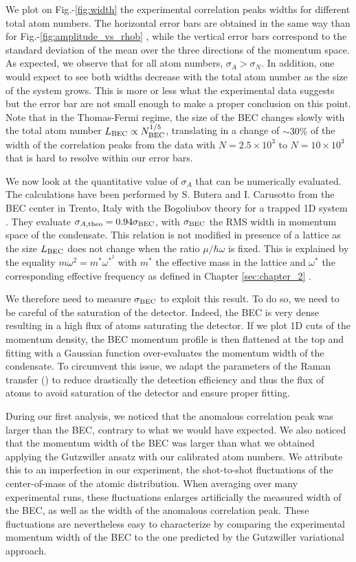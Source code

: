 We plot on Fig.-\ref{fig:width} the experimental correlation peaks widths for different total atom numbers. The horizontal error bars are obtained in the same way than for Fig.-\ref{fig:amplitude_vs_rhob} , while the vertical error bars correspond to the standard deviation of the mean over the three directions of the momentum space. As expected, we observe that for all atom numbers, $\sigma_A > \sigma_N$. In addition, one would expect to see both widths decrease with the total atom number as the size of the system grows. This is more or less what the experimental data suggests but the error bar are not small enough to make a proper conclusion on this point. Note that in the Thomas-Fermi regime, the size of the BEC changes slowly with the total atom number $L_{\rm{BEC}} \propto N_{\rm{BEC}}^{1/5}$, translating in a change of $\sim 30\%$ of the width of the correlation peaks from the data with $N=2.5 \times 10^3$ to $N=10 \times 10^3$ that is hard to resolve within our error bars.

We now look at the quantitative value of $\sigma_A$ that can be numerically evaluated. The calculations have been performed by S. Butera and I. Carusotto from the BEC center in Trento, Italy with the Bogoliubov theory for a trapped 1D system \cite{butera2020}. They evaluate $\sigma_{A,\rm{theo}} = 0.94 \sigma_{\rm{BEC}}$, with $\sigma_{\rm{BEC}}$ the RMS width in momentum space of the condensate. This relation is not modified in presence of a lattice as the size $L_{\rm{BEC}}$ does not change when the ratio $\mu/\hbar \omega$ is fixed. This is explained by the equality $m \omega^2 = m^* \omega^* ^2$ with $m^*$ the effective mass in the lattice and $\omega^*$ the corresponding effective frequency as defined in Chapter \ref{sec:chapter_2} .

We therefore need to measure $\sigma_{\rm{BEC}}$ to exploit this result. To do so, we need to be careful of the saturation of the detector. Indeed, the BEC is very dense resulting in a high flux of atoms saturating the detector. If we plot 1D cuts of the momentum density, the BEC momentum profile is then flattened at the top and fitting with a Gaussian function over-evaluates the momentum width of the condensate. To circumvent this issue, we adapt the parameters of the Raman transfer () to reduce drastically the detection efficiency and thus the flux of atoms to avoid saturation of the detector and ensure proper fitting.

During our first analysis, we noticed that the anomalous correlation peak was larger than the BEC, contrary to what we would have expected. We also noticed that the momentum width of the BEC was larger than what we obtained applying the Gutzwiller ansatz with our calibrated atom numbers. We attribute this to an imperfection in our experiment, the shot-to-shot fluctuations of the center-of-mass of the atomic distribution. When averaging over many experimental runs, these fluctuations enlarges artificially the measured width of the BEC, as well as the width of the anomalous correlation peak. These fluctuations are nevertheless easy to characterize by comparing the experimental momentum width of the BEC to the one predicted by the Gutzwiller variational approach.

